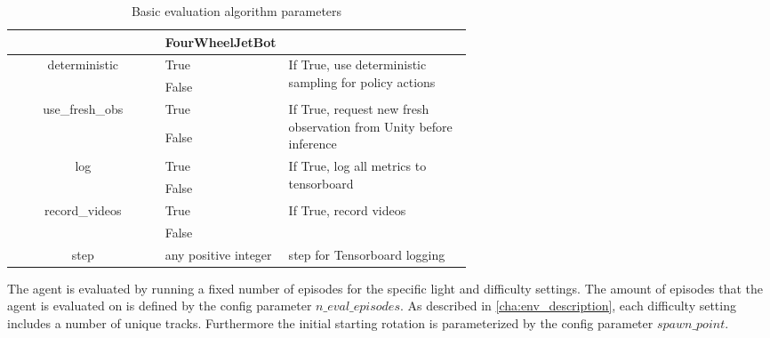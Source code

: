 \begin{table}
\begin{center}
\begin{tabular}{|| c | p{0.20\linewidth} | p{0.4\linewidth} ||}
                                               & FourWheelJetBot      &                                                                                              \\
            \hline
            \multirow{2}{*}{deterministic}     & True                 & \multirow{2}{\linewidth}{If True, use deterministic sampling for policy actions}             \\\cline{2-2}
                                               & False                &                                                                                              \\
            \hline
            \multirow{2}{*}{use\_fresh\_obs}   & True                 & \multirow{2}{\linewidth}{If True, request new fresh observation from Unity before inference} \\\cline{2-2}
                                               & False                &                                                                                              \\
            \hline
            \multirow{2}{*}{log}               & True                 & \multirow{2}{\linewidth}{If True, log all metrics to tensorboard}                            \\\cline{2-2}
                                               & False                &                                                                                              \\
            \hline
            \multirow{2}{*}{record\_videos}    & True                 & \multirow{2}{\linewidth}{If True, record videos}                                             \\\cline{2-2}
                                               & False                &                                                                                              \\
            \hline
            \multirow{1}{*}{step}              & any positive integer & step for Tensorboard logging                                                                 \\
            \hline
        \end{tabular}
    \end{center}
    \caption{Basic evaluation algorithm parameters}
    \label{table:basic_eval_algorithm_parameters}
\end{table}



The agent is evaluated by running a fixed number of episodes for the specific light and difficulty settings. The amount of episodes that the agent is evaluated on is defined by the config parameter $n\_eval\_episodes$. As described in \ref{cha:env_description}, each difficulty setting includes a number of unique tracks. Furthermore the initial starting rotation is parameterized by the config parameter $spawn\_point$.

